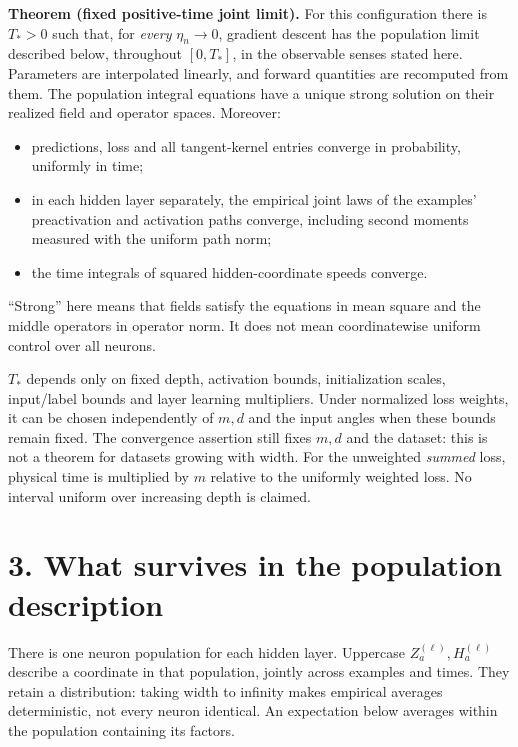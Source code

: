 \medskip
\textbf{Theorem (fixed positive-time joint limit).}
For this configuration there is $T_*>0$ such that, for \emph{every}
$\eta_n\to0$, gradient descent has the population limit described below,
throughout $[0,T_*]$, in the observable senses stated here. Parameters are
interpolated linearly, and forward quantities are recomputed from them.
The population integral equations have a unique strong solution on their
realized field and operator spaces. Moreover:
\begin{itemize}
\item predictions, loss and all tangent-kernel entries converge in probability,
uniformly in time;
\item in each hidden layer separately, the empirical joint laws of the
examples' preactivation and activation paths converge, including second
moments measured with the uniform path norm;
\item the time integrals of squared hidden-coordinate speeds converge.
\end{itemize}
``Strong'' here means that fields satisfy the equations in mean square and
the middle operators in operator norm. It does not mean coordinatewise
uniform control over all neurons.

$T_*$ depends only on fixed depth, activation bounds, initialization scales,
input/label bounds and layer learning multipliers. Under normalized loss
weights, it can be chosen independently of $m,d$ and the input angles when
these bounds remain fixed. The convergence assertion still fixes $m,d$ and
the dataset: this is not a theorem for datasets growing with width. For the
unweighted \emph{summed} loss, physical time is multiplied by $m$ relative
to the uniformly weighted loss. No interval uniform over increasing depth
is claimed.

\newpage
\section*{3. What survives in the population description}

There is one neuron population for each hidden layer. Uppercase
$Z_a^{(\ell)},H_a^{(\ell)}$ describe a coordinate in that population, jointly
across examples and times. They retain a distribution: taking width to
infinity makes empirical averages deterministic, not every neuron identical.
An expectation below averages within the population containing its factors.

